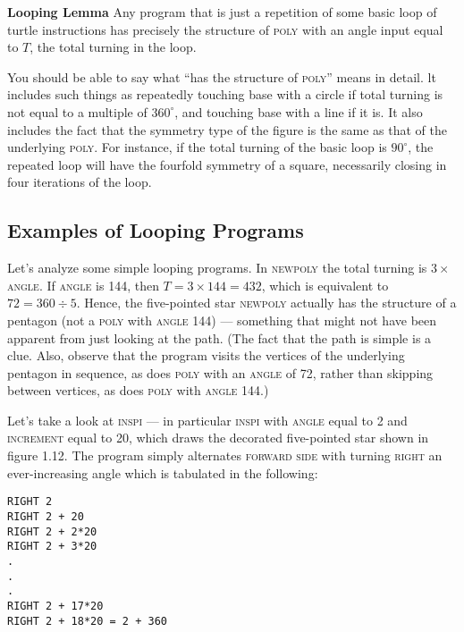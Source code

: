 \documentclass{book}
\begin{document}
\vspace{0.5cm}

\noindent \textbf{Looping Lemma} Any program that is just a repetition of some basic
loop of turtle instructions has precisely the structure of \textsc{poly} with an
angle input equal to $T$, the total turning in the loop.

\vspace{0.5cm}

You should be able to say what ``has the structure of \textsc{poly}'' means in
detail. lt includes such things as repeatedly touching base with a circle
if total turning is not equal to a multiple of $360^{\circ}$, and touching base
with a line if it is. It also includes the fact that the symmetry type of
the figure is the same as that of the underlying \textsc{poly}. For instance, if
the total turning of the basic loop is $90^{\circ}$, the repeated loop will have the
fourfold symmetry of a square, necessarily closing in four iterations of
the loop.

\subsection{Examples of Looping Programs}

Let's analyze some simple looping programs. In \textsc{newpoly} the total
turning is $3 \times$ \textsc{angle}. If \textsc{angle} is 144, then $T = 3 \times 144 = 432$, which is
equivalent to $72 = 360 \div 5$. Hence, the five-pointed star \textsc{newpoly} actually
has the structure of a pentagon (not a \textsc{poly} with \textsc{angle 144}) --- something
that might not have been apparent from just looking at the path. (The
fact that the path is simple is a clue. Also, observe that the program
visits the vertices of the underlying pentagon in sequence, as does \textsc{poly}
with an \textsc{angle} of 72, rather than skipping between vertices, as does \textsc{poly}
with \textsc{angle} 144.)

\indent
Let's take a look at \textsc{inspi} --- in particular \textsc{inspi} with \textsc{angle} equal to
2 and \textsc{increment} equal to 20, which draws the decorated five-pointed
star shown in figure 1.12. The program simply alternates \textsc{forward side}
with turning \textsc{right} an ever-increasing angle which is tabulated in the
following:

\begin{verbatim}
RIGHT 2
RIGHT 2 + 20
RIGHT 2 + 2*20
RIGHT 2 + 3*20
.
.
.
RIGHT 2 + 17*20
RIGHT 2 + 18*20 = 2 + 360
\end{verbatim}
\end{document}

